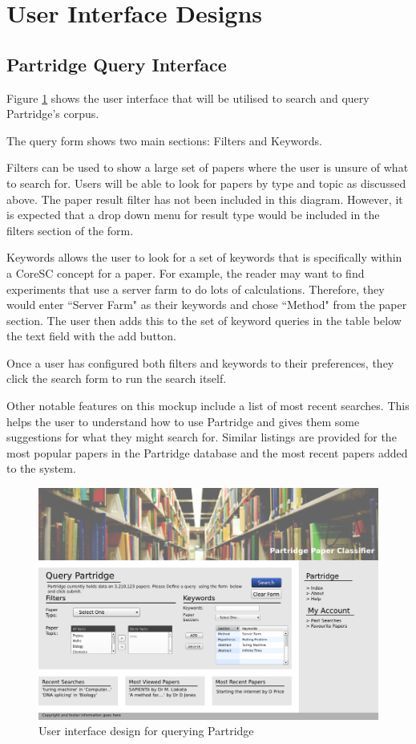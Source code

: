 
\appendix
\section{User Interface Designs}
\label{sec:ui_designs}

\subsection{ Partridge Query Interface}


Figure \ref{fig:ui_mockup} shows the user interface that will be utilised to
search and query Partridge's corpus. 

The query form shows two main sections: Filters and Keywords. 

Filters can be used to show a large set of papers where the user is unsure of
what to search for. Users will be able to look for papers by type and topic as
discussed above. The paper result filter has not been included in this diagram.
However, it is expected that a drop down menu for result type would be included
in the filters section of the form.

Keywords allows the user to look for a set of keywords that is specifically
within a CoreSC concept for a paper. For example, the reader may want to find
experiments that use a server farm to do lots of calculations. Therefore, they
would enter ``Server Farm" as their keywords and chose ``Method" from the paper
section. The user then adds this to the set of keyword queries in the table
below the text field with the add button.

Once a user has configured both filters and keywords to their preferences, they
click the search form to run the search itself.

Other notable features on this mockup include a list of most recent searches.
This helps the user to understand how to use Partridge and gives them some
suggestions for what they might search for. Similar listings are provided for
the most popular papers in the Partridge database and the most recent papers
added to the system.

\begin{figure}[!ht]
\includegraphics[width=\textwidth]{images/mockup_1.png}
\caption{User interface design for querying Partridge}
\label{fig:ui_mockup}
\end{figure}


